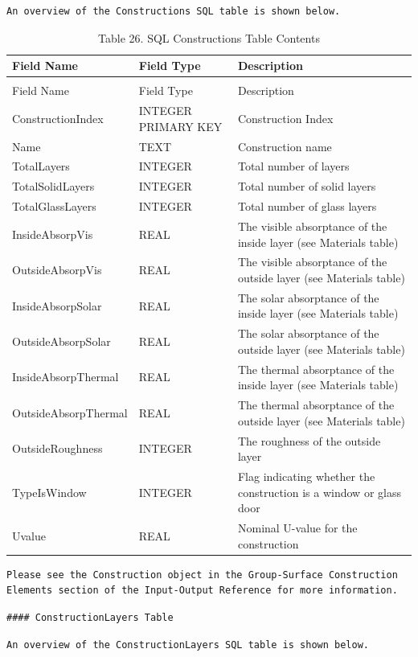 \begin{lstlisting}
An overview of the Constructions SQL table is shown below.
\end{lstlisting}

\begin{longtable}[c]{p{1.5in}p{1.5in}p{3.0in}}
\caption{Table 26. SQL Constructions Table Contents \label{table:table-26.-sql-constructions-table-contents}} \tabularnewline
\toprule 
Field Name & Field Type & Description \tabularnewline
\midrule
\endfirsthead

\caption[]{Table 26. SQL Constructions Table Contents} \tabularnewline
\toprule 
Field Name & Field Type & Description \tabularnewline
\midrule
\endhead

ConstructionIndex & INTEGER PRIMARY KEY & Construction Index \tabularnewline
Name & TEXT & Construction name \tabularnewline
TotalLayers & INTEGER & Total number of layers \tabularnewline
TotalSolidLayers & INTEGER & Total number of solid layers \tabularnewline
TotalGlassLayers & INTEGER & Total number of glass layers \tabularnewline
InsideAbsorpVis & REAL & The visible absorptance of the inside layer (see Materials table) \tabularnewline
OutsideAbsorpVis & REAL & The visible absorptance of the outside layer (see Materials table) \tabularnewline
InsideAbsorpSolar & REAL & The solar absorptance of the inside layer (see Materials table) \tabularnewline
OutsideAbsorpSolar & REAL & The solar absorptance of the outside layer (see Materials table) \tabularnewline
InsideAbsorpThermal & REAL & The thermal absorptance of the inside layer (see Materials table) \tabularnewline
OutsideAbsorpThermal & REAL & The thermal absorptance of the outside layer (see Materials table) \tabularnewline
OutsideRoughness & INTEGER & The roughness of the outside layer \tabularnewline
TypeIsWindow & INTEGER & Flag indicating whether the construction is a window or glass door \tabularnewline
Uvalue & REAL & Nominal U-value for the construction \tabularnewline
\bottomrule
\end{longtable}

\begin{lstlisting}
Please see the Construction object in the Group-Surface Construction Elements section of the Input-Output Reference for more information.
\end{lstlisting}

\begin{lstlisting}
#### ConstructionLayers Table
\end{lstlisting}

\begin{lstlisting}
An overview of the ConstructionLayers SQL table is shown below.
\end{lstlisting}

